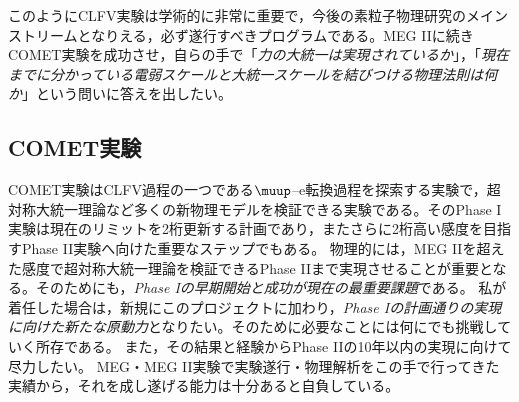 

このようにCLFV実験は学術的に非常に重要で，今後の素粒子物理研究のメインストリームとなりえる，必ず遂行すべきプログラムである。MEG IIに続きCOMET実験を成功させ，自らの手で「\emph{力の大統一は実現されているか}」，「\emph{現在までに分かっている電弱スケールと大統一スケールを結びつける物理法則は何か}」という問いに答えを出したい。

\subsection{COMET実験}
COMET実験はCLFV過程の一つである$\muup$--e転換過程を探索する実験で，超対称大統一理論など多くの新物理モデルを検証できる実験である。そのPhase I実験は現在のリミットを2桁更新する計画であり，またさらに2桁高い感度を目指すPhase II実験へ向けた重要なステップでもある。
物理的には，MEG IIを超えた感度で超対称大統一理論を検証できるPhase IIまで実現させることが重要となる。そのためにも，\emph{Phase Iの早期開始と成功が現在の最重要課題}である。
私が着任した場合は，新規にこのプロジェクトに加わり，\emph{Phase Iの計画通りの実現に向けた新たな原動力}となりたい。そのために必要なことには何にでも挑戦していく所存である。
また，その結果と経験からPhase IIの10年以内の実現に向けて尽力したい。
MEG・MEG II実験で実験遂行・物理解析をこの手で行ってきた実績から，それを成し遂げる能力は十分あると自負している。

